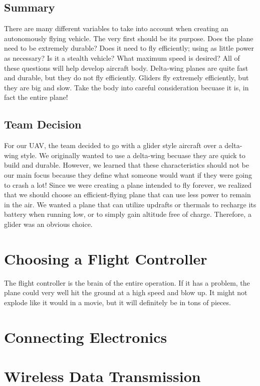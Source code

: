 \documentclass[12pt,journal,compsoc]{IEEEtran}
\begin{document}
\subsection{Summary}
There are many different variables to take into account when creating an autonomously flying vehicle. The very first should be its purpose. Does the plane need to be extremely durable? Does it need to fly efficiently; using as little power as necessary? Is it a stealth vehicle? What maximum speed is desired? All of these questions will help develop aircraft body. Delta-wing planes are quite fast and durable, but they do not fly efficiently. Gliders fly extremely efficiently, but they are big and slow. Take the body into careful consideration becuase it is, in fact the entire plane!
\subsection{Team Decision}
For our UAV, the team decided to go with a glider style aircraft over a delta-wing style. We originally wanted to use a delta-wing becuase they are quick to build and durable. However, we learned that these characteristics should not be our main focus because they define what someone would want if they were going to crash a lot! Since we were creating a plane intended to fly forever, we realized that we should choose an efficient-flying plane that can use less power to remain in the air. We wanted a plane that can utilize updrafts or thermals to recharge its battery when running low, or to simply gain altitude free of charge. Therefore, a glider was an obvious choice.

\section{Choosing a Flight Controller}
The flight controller is the brain of the entire operation. If it has a problem, the plane could very well hit the ground at a high speed and blow up. It might not explode like it would in a movie, but it will definitely be in tons of pieces.

\section{Connecting Electronics}

\section{Wireless Data Transmission}
\end{document}

